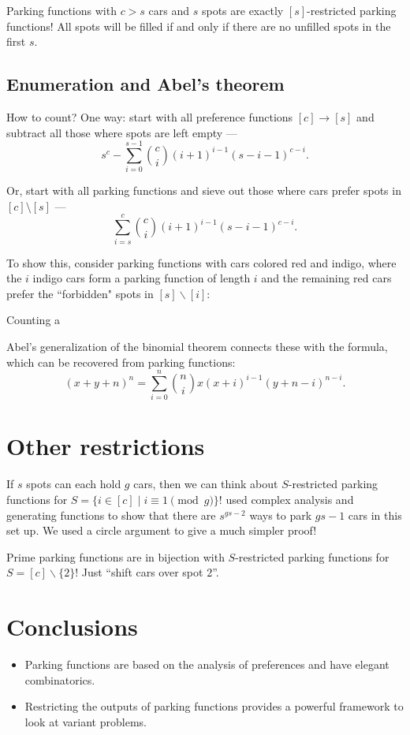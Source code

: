 \documentclass[thesis]{hmcposter}
\begin{document}
\begin{poster}
Parking functions with $c > s$ cars and $s$ spots are exactly $[s]$-restricted parking functions! All spots will be filled if and only if there are no unfilled spots in the first $s$.

\subsection{Enumeration and Abel's theorem}

How to count? One way: start with all preference functions $[c] \to [s]$ and subtract all those where spots are left empty ---
\[
	s^{c} - \sum_{i = 0}^{s - 1} \binom{c}{i} (i + 1)^{i - 1} (s - i - 1)^{c - i}.
\]

Or, start with all parking functions and sieve out those where cars prefer spots in $[c] \setminus [s]$ ---
\[
	\sum_{i = s}^{c} \binom{c}{i} (i + 1)^{i - 1} (s - i - 1)^{c - i}.
\]

To show this, consider parking functions with cars colored red and indigo, where the $i$ indigo cars form a parking function of length $i$ and the remaining red cars prefer the ``forbidden" spots in $[s]\backslash [i]$:

Counting a 

Abel's generalization of the binomial theorem connects these with the formula, which can be recovered from parking functions:
\[
	(x + y + n)^{n} = \sum_{i = 0}^{n} \binom{n}{i} x (x + i)^{i - 1} (y + n - i)^{n - i}.
\]

\newcolumn 
\section{Other restrictions}

If $s$ spots can each hold $g$ cars, then we can think about $S$-restricted parking functions for $S = \{ i \in [c] \mid i \equiv 1 \pmod g \}$! \cite{blake-konheim-1977} used complex analysis and generating functions to show that there are $s^{gs - 2}$ ways to park $gs - 1$ cars in this set up. We used a circle argument to give a much simpler proof!

Prime parking functions are in bijection with $S$-restricted parking functions for $S = [c]\backslash\{2\}$! Just ``shift cars over spot 2''.

\section{Conclusions}

\begin{itemize}
    \item Parking functions are based on the analysis of preferences and have elegant combinatorics.
    \item Restricting the outputs of parking functions provides a powerful framework to look at variant problems.
\end{itemize}


\end{poster}
\end{document}
